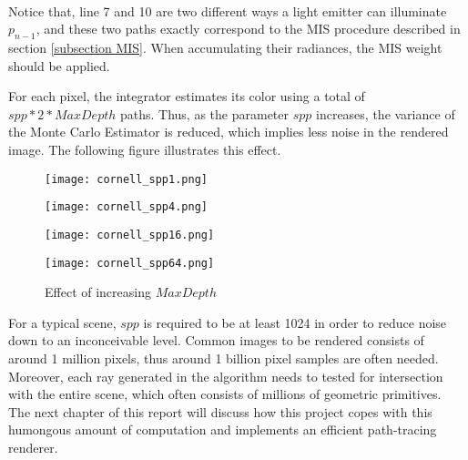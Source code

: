 ~

Notice that, line 7 and 10 are two different ways a light emitter can illuminate $p_{n-1}$, and these two paths exactly correspond to the MIS procedure described in section \ref{subsection MIS}. When accumulating their radiances, the MIS weight should be applied.


For each pixel, the integrator estimates its color using a total of $spp*2*MaxDepth$ paths. Thus, as the parameter $spp$ increases, the variance of the Monte Carlo Estimator is reduced, which implies less noise in the rendered image. The following figure illustrates this effect.


\begin{figure}[H]
    \centering
    
    \begin{minipage}[t]{.45\textwidth}
        \centering
        \vspace{0pt}
        \texttt{[image: cornell\_spp1.png]}
    \end{minipage}
    \begin{minipage}[t]{.45\textwidth}
        \centering
        \vspace{0pt}
        \texttt{[image: cornell\_spp4.png]}
    \end{minipage}

    \vspace{0.3cm}

    \begin{minipage}[t]{.45\textwidth}
        \centering
        \vspace{0pt}
        \texttt{[image: cornell\_spp16.png]}
    \end{minipage}
    \begin{minipage}[t]{.45\textwidth}
        \centering
        \vspace{0pt}
        \texttt{[image: cornell\_spp64.png]}
    \end{minipage}
    \caption{Effect of increasing $MaxDepth$}
    \label{fig maxdepth}
\end{figure}

For a typical scene, $spp$ is required to be at least 1024 in order to reduce noise down to an inconceivable level. Common images to be rendered consists of around 1 million pixels, thus around 1 billion pixel samples are often needed. Moreover, each ray generated in the algorithm needs to tested for intersection with the entire scene, which often consists of millions of geometric primitives. The next chapter of this report will discuss how this project copes with this humongous amount of computation and implements an efficient path-tracing renderer.

